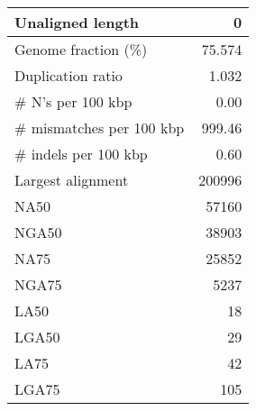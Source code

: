 \documentclass[12pt,a4paper]{article}
\begin{document}
\begin{table}[ht]
\begin{center}
\begin{tabular}{|l*{1}{|r}|}
Unaligned length & 0 \\ \hline
Genome fraction (\%) & 75.574 \\ \hline
Duplication ratio & 1.032 \\ \hline
\# N's per 100 kbp & 0.00 \\ \hline
\# mismatches per 100 kbp & 999.46 \\ \hline
\# indels per 100 kbp & 0.60 \\ \hline
Largest alignment & 200996 \\ \hline
NA50 & 57160 \\ \hline
NGA50 & 38903 \\ \hline
NA75 & 25852 \\ \hline
NGA75 & 5237 \\ \hline
LA50 & 18 \\ \hline
LGA50 & 29 \\ \hline
LA75 & 42 \\ \hline
LGA75 & 105 \\ \hline
\end{tabular}
\end{center}
\end{table}
\end{document}
